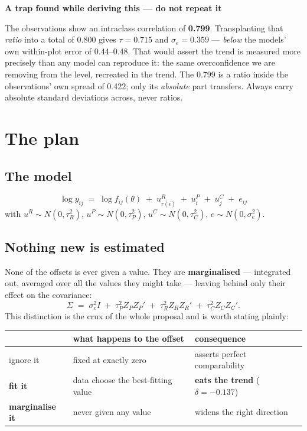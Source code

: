 \documentclass[11pt]{article}
\newenvironment{warnbox}[1][]{%
  \begin{leftbar}\noindent\textcolor{red!60!black}{\textbf{\small #1}}\par\vspace{0.3em}\small}{\end{leftbar}}
\begin{document}
\begin{warnbox}[A trap found while deriving this --- do not repeat it]
The observations show an intraclass correlation of \textbf{0.799}. Transplanting
that \emph{ratio} into a total of 0.800 gives $\tau = 0.715$ and $\sigma_e = 0.359$
--- \emph{below} the models' own within-plot error of 0.44--0.48. That would assert
the trend is measured more precisely than any model can reproduce it: the same
overconfidence we are removing from the level, recreated in the trend. The 0.799 is
a ratio inside the observations' own spread of 0.422; only its \emph{absolute} part
transfers. Always carry absolute standard deviations across, never ratios.
\end{warnbox}

\section{The plan}

\subsection{The model}

\[
\log y_{ij} \;=\; \log f_{ij}(\theta) \;+\; u^{R}_{r(i)} \;+\; u^{P}_{i} \;+\;
u^{C}_{j} \;+\; e_{ij}
\]
with $u^{R}\sim N(0,\tau_R^2)$, $u^{P}\sim N(0,\tau_P^2)$,
$u^{C}\sim N(0,\tau_C^2)$, $e\sim N(0,\sigma_e^2)$.

\subsection{Nothing new is estimated}

None of the offsets is ever given a value. They are \textbf{marginalised} ---
integrated out, averaged over all the values they might take --- leaving behind only
their effect on the covariance:
\[
\Sigma \;=\; \sigma_e^2 I \;+\; \tau_P^2 Z_P Z_P' \;+\; \tau_R^2 Z_R Z_R'
\;+\; \tau_C^2 Z_C Z_C' .
\]
This distinction is the crux of the whole proposal and is worth stating plainly:

\begin{center}
\begin{tabular}{lll}
\toprule
 & what happens to the offset & consequence \\
\midrule
ignore it & fixed at exactly zero & asserts perfect comparability \\
\textbf{fit it} & data choose the best-fitting value & \textbf{eats the trend} ($\delta=-0.137$) \\
\textbf{marginalise it} & never given any value & widens the right direction \\
\bottomrule
\end{tabular}
\end{center}
\end{document}

